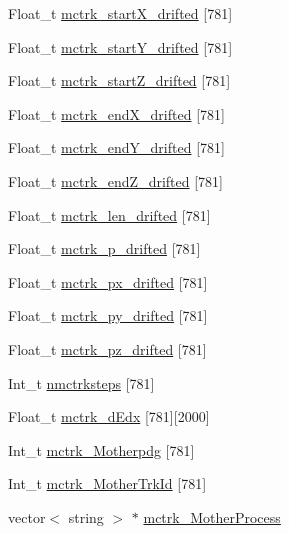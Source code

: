 \begin{DoxyCompactItemize}
\item 
Float\-\_\-t \hyperlink{classanatree_aedee6b5127f774aeeb8c05bab7bd12b1}{mctrk\-\_\-start\-X\-\_\-drifted} \mbox{[}781\mbox{]}
\item 
Float\-\_\-t \hyperlink{classanatree_a65d327d83db67f6bad92b0a83466e190}{mctrk\-\_\-start\-Y\-\_\-drifted} \mbox{[}781\mbox{]}
\item 
Float\-\_\-t \hyperlink{classanatree_a9c8ea5281a9676e8c414a680d390a57a}{mctrk\-\_\-start\-Z\-\_\-drifted} \mbox{[}781\mbox{]}
\item 
Float\-\_\-t \hyperlink{classanatree_a626ecccc567c38f435ea604dafd4be44}{mctrk\-\_\-end\-X\-\_\-drifted} \mbox{[}781\mbox{]}
\item 
Float\-\_\-t \hyperlink{classanatree_aeaff87f01d8e799b1ff16122447d44f3}{mctrk\-\_\-end\-Y\-\_\-drifted} \mbox{[}781\mbox{]}
\item 
Float\-\_\-t \hyperlink{classanatree_a9285fa2ffc0bb2fda0b32c0d6b1ada38}{mctrk\-\_\-end\-Z\-\_\-drifted} \mbox{[}781\mbox{]}
\item 
Float\-\_\-t \hyperlink{classanatree_a587dfac24fac35021b281c3a2d96daf6}{mctrk\-\_\-len\-\_\-drifted} \mbox{[}781\mbox{]}
\item 
Float\-\_\-t \hyperlink{classanatree_a79f7f59f922538a28b1e3418c6b0630a}{mctrk\-\_\-p\-\_\-drifted} \mbox{[}781\mbox{]}
\item 
Float\-\_\-t \hyperlink{classanatree_a897a99b9eb709719c79e6389a8e31221}{mctrk\-\_\-px\-\_\-drifted} \mbox{[}781\mbox{]}
\item 
Float\-\_\-t \hyperlink{classanatree_a534eca9e46f0ef13d81de3a6c01ca9f3}{mctrk\-\_\-py\-\_\-drifted} \mbox{[}781\mbox{]}
\item 
Float\-\_\-t \hyperlink{classanatree_aad4d05e1a44689cdaade31ed085e50dc}{mctrk\-\_\-pz\-\_\-drifted} \mbox{[}781\mbox{]}
\item 
Int\-\_\-t \hyperlink{classanatree_a22f183fefa5ec630ff30c94de79614a1}{nmctrksteps} \mbox{[}781\mbox{]}
\item 
Float\-\_\-t \hyperlink{classanatree_ad0add36216aaa16bee6e1ff6c3905456}{mctrk\-\_\-d\-Edx} \mbox{[}781\mbox{]}\mbox{[}2000\mbox{]}
\item 
Int\-\_\-t \hyperlink{classanatree_a29ed34336b58343e063896bdb0e8af5b}{mctrk\-\_\-\-Motherpdg} \mbox{[}781\mbox{]}
\item 
Int\-\_\-t \hyperlink{classanatree_adcb3116bc91938e017a7dcf87195dd40}{mctrk\-\_\-\-Mother\-Trk\-Id} \mbox{[}781\mbox{]}
\item 
vector$<$ string $>$ $\ast$ \hyperlink{classanatree_a1b9d799bba5001e7e69a479c579facdc}{mctrk\-\_\-\-Mother\-Process}

\end{DoxyCompactItemize}
